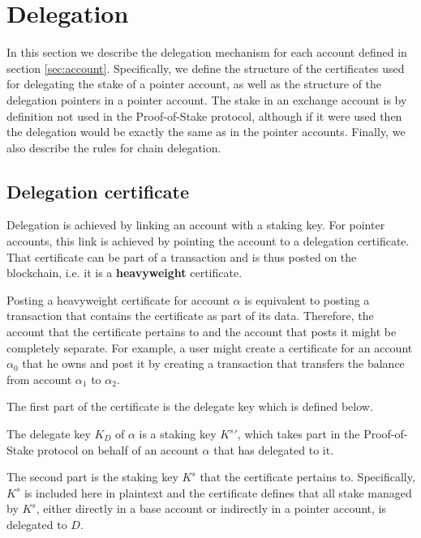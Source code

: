 \section{Delegation}

In this section we describe the delegation mechanism for each account defined in section \ref{sec:account}. Specifically, we define the structure of the certificates used for delegating the stake of a pointer account, as well as the structure of the delegation pointers in a pointer account. The stake in an exchange account is by definition not used in the Proof-of-Stake protocol, although if it were used then the delegation would be exactly the same as in the pointer accounts. Finally, we also describe the rules for chain delegation.

\subsection{Delegation certificate}

Delegation is achieved by linking an account with a staking key. For pointer accounts, this link is achieved by pointing the account to a delegation certificate. That certificate can be part of a transaction and is thus posted on the blockchain, i.e. it is a \textbf{heavyweight} certificate.

Posting a heavyweight certificate for account $\alpha$ is equivalent to posting a transaction that contains the certificate as part of its data. Therefore, the account that the certificate pertains to and the account that posts it might be completely separate. For example, a user might create a certificate for an account $\alpha_0$ that he owns and post it by creating a transaction that transfers the balance from account $\alpha_1$ to $\alpha_2$.

The first part of the certificate is the delegate key which is defined below.

\begin{defn}\label{def:delegate_key}
The delegate key $K_D$ of $\alpha$ is a staking key ${K^s}'$, which takes part in the Proof-of-Stake protocol on behalf of an account $\alpha$ that has delegated to it.
\end{defn}

The second part is the staking key $K^s$ that the certificate pertains to. Specifically, $K^s$ is included here in plaintext and the certificate defines that all stake managed by $K^s$, either directly in a base account or indirectly in a pointer account, is delegated to $D$.


